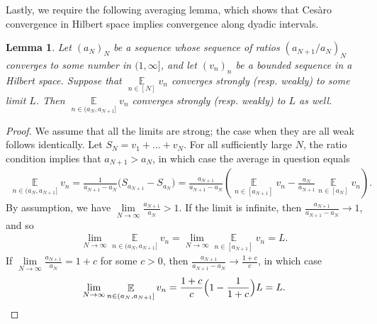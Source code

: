 \documentclass[11pt]{amsart}
\newtheorem{lemma}{Lemma}[section]
\theoremstyle{definition}
\DeclareMathOperator*{\E}{\mathbb{E}}
\newcommand{\1}{{\mathbf{1}}}
\newcommand{\brac}[1]{\mathopen{}\left( #1 \mathclose{}\right)}
\newcommand{\Bigbrac}[1]{\Bigl( #1 \Bigr)}
\begin{document}
Lastly, we require the following averaging lemma, which shows that Ces\`aro convergence in Hilbert space implies convergence along dyadic intervals. 
\begin{lemma}\label{L: dyadic intervals}
Let $(a_N)_N$ be a sequence whose sequence of ratios $(a_{N+1}/a_N)_N$ converges to some number in $(1, \infty]$, and let $(v_n)_n$ be a bounded sequence in a Hilbert space. Suppose that $\E\limits_{n\in[N]}v_n$ converges strongly (resp. weakly) to some limit $L$. Then $\E\limits_{n\in(a_N, a_{N+1}]} v_n$ converges strongly (resp. weakly) to $L$ as well.
\end{lemma}
\begin{proof}
We assume that all the limits are strong; the case when they are all weak follows identically.
    Let $S_N=v_1+\dots+v_N$. {For all sufficiently large $N$, the ratio condition implies that $a_{N+1}>a_N$,} in which case the average in question equals
    \begin{align*}
        \E\limits_{n\in(a_N, a_{N+1}]} v_n =\frac{1}{a_{N+1}-a_N} \big(S_{a_{N+1}} -S_{a_N}\big) = \frac{a_{N+1}}{a_{N+1}-a_N}\brac{\E\limits_{n\in[a_{N+1}]} v_n - \frac{a_N}{a_{N+1}}\E\limits_{n\in[a_{N}]} v_n}.
    \end{align*}
    By assumption, we have $\lim\limits_{N\to\infty}\frac{a_{N+1}}{a_N}>1$. If the limit is infinite, then $\frac{a_{N+1}}{a_{N+1}-a_N}\to 1$, and so
\begin{align*}
    \lim_{N\to\infty} \E\limits_{n\in(a_N, a_{N+1}]} v_n = \lim_{N\to\infty} \E\limits_{n\in[a_{N+1}]} v_n = L.
\end{align*}
If $\lim\limits_{N\to\infty}\frac{a_{N+1}}{a_N} = 1+c$ for some $c>0$, then $\frac{a_{N+1}}{a_{N+1}-a_N}\to \frac{1+c}{c}$, in which case
\begin{align*}
    \lim_{N\to\infty}\E\limits_{n\in(a_N, a_{N+1}]} v_n = \frac{1+c}{c}\Bigbrac{1-\frac{1}{1+c}}L = L.
\end{align*}
\end{proof}
\end{document}
